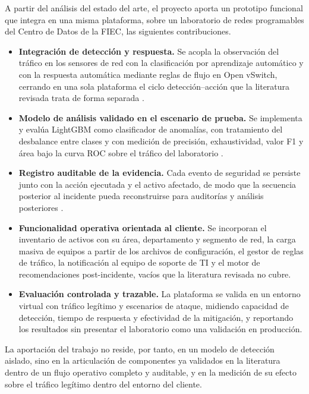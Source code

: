 A partir del an\'alisis del estado del arte, el proyecto aporta un prototipo funcional que integra en una misma plataforma, sobre un laboratorio de redes programables del Centro de Datos de la FIEC, las siguientes contribuciones.

\begin{itemize}
    \item \textbf{Integraci\'on de detecci\'on y respuesta.} Se acopla la observaci\'on del tr\'afico en los sensores de red con la clasificaci\'on por aprendizaje autom\'atico y con la respuesta autom\'atica mediante reglas de flujo en Open vSwitch, cerrando en una sola plataforma el ciclo detecci\'on--acci\'on que la literatura revisada trata de forma separada \parencite{braga2010,shin2013}.
    \item \textbf{Modelo de an\'alisis validado en el escenario de prueba.} Se implementa y eval\'ua LightGBM como clasificador de anomal\'ias, con tratamiento del desbalance entre clases y con medici\'on de precisi\'on, exhaustividad, valor F1 y \'area bajo la curva ROC sobre el tr\'afico del laboratorio \parencite{lightgbm2017}.
    \item \textbf{Registro auditable de la evidencia.} Cada evento de seguridad se persiste junto con la acci\'on ejecutada y el activo afectado, de modo que la secuencia posterior al incidente pueda reconstruirse para auditor\'ias y an\'alisis posteriores \parencite{nist80061r2}.
    \item \textbf{Funcionalidad operativa orientada al cliente.} Se incorporan el inventario de activos con su \'area, departamento y segmento de red, la carga masiva de equipos a partir de los archivos de configuraci\'on, el gestor de reglas de tr\'afico, la notificaci\'on al equipo de soporte de TI y el motor de recomendaciones post-incidente, vac\'ios que la literatura revisada no cubre.
    \item \textbf{Evaluaci\'on controlada y trazable.} La plataforma se valida en un entorno virtual con tr\'afico leg\'itimo y escenarios de ataque, midiendo capacidad de detecci\'on, tiempo de respuesta y efectividad de la mitigaci\'on, y reportando los resultados sin presentar el laboratorio como una validaci\'on en producci\'on.
\end{itemize}

La aportaci\'on del trabajo no reside, por tanto, en un modelo de detecci\'on aislado, sino en la articulaci\'on de componentes ya validados en la literatura dentro de un flujo operativo completo y auditable, y en la medici\'on de su efecto sobre el tr\'afico leg\'itimo dentro del entorno del cliente.
